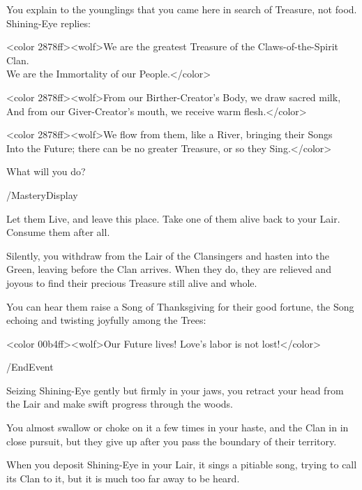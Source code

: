 You explain to the younglings that you came here in search of Treasure, not
food. Shining-Eye replies:

<color 2878ff><wolf>We are the greatest Treasure of the Claws-of-the-Spirit
Clan.\\ We are the Immortality of our People.</color>

<color 2878ff><wolf>From our Birther-Creator's Body, we draw sacred milk,\\
And from our Giver-Creator's mouth, we receive warm flesh.</color>

<color 2878ff><wolf>We flow from them, like a River, bringing their Songs\\
Into the Future; there can be no greater Treasure, or so they Sing.</color>


What will you do?

/MasteryDisplay

\option Let them Live, and leave this place. 
\option Take one of them alive back to your Lair. 
\option Consume them after all.
	  


Silently, you withdraw from the Lair of the Clansingers and hasten into the
Green, leaving before the Clan arrives. When they do, they are relieved and
joyous to find their precious Treasure still alive and whole.

You can hear them raise a Song of Thanksgiving for their good fortune, the Song
echoing and twisting joyfully among the Trees:

<color 00b4ff><wolf>Our Future lives! Love's labor is not lost!</color>

\option /EndEvent   
   


Seizing Shining-Eye gently but firmly in your jaws, you retract your head from
the Lair and make swift progress through the woods.

You almost swallow or choke on it a few times in your haste, and the Clan in in
close pursuit, but they give up after you pass the boundary of their territory.

When you deposit Shining-Eye in your Lair, it sings a pitiable song, trying to
call its Clan to it, but it is much too far away to be heard.

